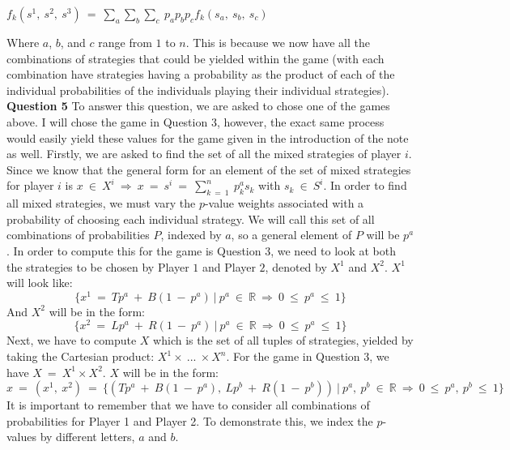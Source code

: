 \documentclass{article}
\begin{document}
\begin{center}
    $f_k(s^1, \ s^2, \ s^3) \ = \ \displaystyle\sum_{a}\displaystyle\sum_{b}\displaystyle\sum_{c} \ p_ap_bp_c f_k(s_a, \ s_b, \ s_c)$
\end{center}
Where $a$, $b$, and $c$ range from $1$ to $n$. This is because we now have all the combinations of strategies that could be yielded within the game (with each combination have strategies having a probability as the product of each of the individual probabilities of the individuals playing their individual strategies).
\newline\newline
\textbf{Question 5}
\newline\newline
To answer this question, we are asked to chose one of the games above. I will chose the game in Question 3, however, the exact same process would easily yield these values for the game given in the introduction of the note as well. Firstly, we are asked to find the set of all the mixed strategies of player $i$. Since we know that the general form for an element of the set of mixed strategies for player $i$ is $x \ \in \ X^i \ \Rightarrow \ x \ = \ s^i \ = \ \sum_{k \ = \ 1}^{n} \ p^a_ks_k$ with $s_k \ \in \ S^i$. In order to find all mixed strategies, we must vary the $p$-value weights associated with a probability of choosing each individual strategy. We will call this set of all combinations of probabilities $P$, indexed by $a$, so a general element of $P$ will be $p^a$.
\newline\newline
In order to compute this for the game is Question 3, we need to look at both the strategies to be chosen by Player $1$ and Player $2$, denoted by $X^1$ and $X^2$. $X^1$ will look like:
$$\{x^1 \ = \ Tp^a \ + \ B(1 \ - \ p^a) \ | \ p^a \ \in \ \mathbb{R} \ \Rightarrow \ 0 \ \leq \ p^a \ \leq \ 1\}$$
And $X^2$ will be in the form:
$$\{x^2 \ = \ Lp^a \ + \ R(1 \ - \ p^a) \ | \ p^a \ \in \ \mathbb{R} \ \Rightarrow \ 0 \ \leq \ p^a \ \leq \ 1\}$$
Next, we have to compute $X$ which is the set of all tuples of strategies, yielded by taking the Cartesian product: $X^1 \times \ ... \ \times X^n$. For the game in Question 3, we have $X \ = \ X^1 \times X^2$. $X$ will be in the form:
$$x \ = \ (x^1, \ x^2) \ = \ \{(Tp^a \ + \ B(1 \ - \ p^a), \ Lp^b \ + \ R(1 \ - \ p^b) ) \ | \ p^a, \ p^b \ \in \ \mathbb{R} \ \Rightarrow \ 0 \ \leq \ p^a, \ p^b \ \leq \ 1\}$$
It is important to remember that we have to consider all combinations of probabilities for Player 1 and Player 2. To demonstrate this, we index the $p$-values by different letters, $a$ and $b$.
\end{document}

